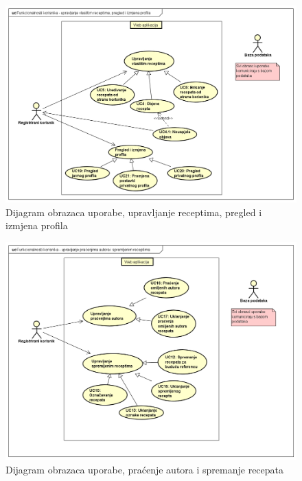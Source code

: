 				\begin{figure}[H]
					\includegraphics[scale= 0.42]{slike/UseCase Diagram2.png}
					\centering
					\caption{Dijagram obrazaca uporabe, upravljanje receptima, pregled i izmjena profila}
					\label{fig:Dijagram obrazaca uporabe, upravljanje receptima, pregled i izmjena profila}
				\end{figure}
				\begin{figure}[H]
					\includegraphics[scale= 0.42]{slike/UseCase Diagram3.png}
					\centering
					\caption{Dijagram obrazaca uporabe, praćenje autora i spremanje recepata}
					\label{fig:Dijagram obrazaca uporabe, praćenje autora i spremanje recepata}
				\end{figure}

